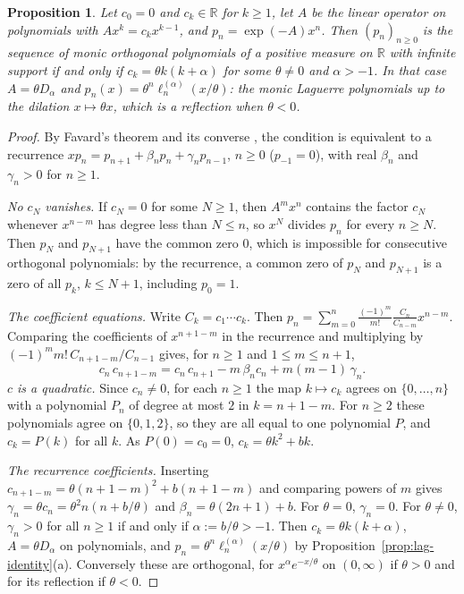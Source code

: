 \documentclass[11pt]{amsart}
\newtheorem{proposition}[theorem]{Proposition}
\theoremstyle{definition}
\theoremstyle{remark}
\numberwithin{equation}{section}
\newcommand{\R}{\mathbb{R}}
\begin{document}
\begin{proposition}\label{prop:lag-unique}
Let $c_0=0$ and $c_k\in\R$ for $k\ge1$, let $A$ be the linear operator on polynomials with $Ax^k=c_kx^{k-1}$, and $p_n=\exp(-A)x^n$. Then $(p_n)_{n\ge0}$ is the sequence of monic orthogonal polynomials of a positive measure on $\R$ with infinite support if and only if $c_k=\theta k(k+\alpha)$ for some $\theta\ne0$ and $\alpha>-1$. In that case $A=\theta D_\alpha$ and $p_n(x)=\theta^n\ell^{(\alpha)}_n(x/\theta)$: the monic Laguerre polynomials up to the dilation $x\mapsto\theta x$, which is a reflection when $\theta<0$.
\end{proposition}

\begin{proof}
By Favard's theorem \cite[Chapter~I, Section~4]{Chi} and its converse \cite[Theorem~3.2.1]{Sz}, the condition is equivalent to a recurrence $xp_n=p_{n+1}+\beta_np_n+\gamma_np_{n-1}$, $n\ge0$ ($p_{-1}=0$), with real $\beta_n$ and $\gamma_n>0$ for $n\ge1$.

\emph{No $c_N$ vanishes.} If $c_N=0$ for some $N\ge1$, then $A^mx^n$ contains the factor $c_N$ whenever $x^{n-m}$ has degree less than $N\le n$, so $x^N$ divides $p_n$ for every $n\ge N$. Then $p_N$ and $p_{N+1}$ have the common zero $0$, which is impossible for consecutive orthogonal polynomials: by the recurrence, a common zero of $p_N$ and $p_{N+1}$ is a zero of all $p_k$, $k\le N+1$, including $p_0=1$.

\emph{The coefficient equations.} Write $C_k=c_1\cdots c_k$. Then $p_n=\sum_{m=0}^{n}\frac{(-1)^m}{m!}\frac{C_n}{C_{n-m}}x^{n-m}$. Comparing the coefficients of $x^{n+1-m}$ in the recurrence and multiplying by $(-1)^mm!\,C_{n+1-m}/C_{n-1}$ gives, for $n\ge1$ and $1\le m\le n+1$,
\[
c_n\,c_{n+1-m}=c_n\,c_{n+1}-m\,\beta_nc_n+m(m-1)\,\gamma_n .
\]
\emph{$c$ is a quadratic.} Since $c_n\ne0$, for each $n\ge1$ the map $k\mapsto c_k$ agrees on $\{0,\dots,n\}$ with a polynomial $P_n$ of degree at most $2$ in $k=n+1-m$. For $n\ge2$ these polynomials agree on $\{0,1,2\}$, so they are all equal to one polynomial $P$, and $c_k=P(k)$ for all $k$. As $P(0)=c_0=0$, $c_k=\theta k^2+bk$.

\emph{The recurrence coefficients.} Inserting $c_{n+1-m}=\theta(n+1-m)^2+b(n+1-m)$ and comparing powers of $m$ gives $\gamma_n=\theta c_n=\theta^2n(n+b/\theta)$ and $\beta_n=\theta(2n+1)+b$. For $\theta=0$, $\gamma_n=0$. For $\theta\ne0$, $\gamma_n>0$ for all $n\ge1$ if and only if $\alpha:=b/\theta>-1$. Then $c_k=\theta k(k+\alpha)$, $A=\theta D_\alpha$ on polynomials, and $p_n=\theta^n\ell^{(\alpha)}_n(x/\theta)$ by Proposition~\ref{prop:lag-identity}(a). Conversely these are orthogonal, for $x^\alpha e^{-x/\theta}$ on $(0,\infty)$ if $\theta>0$ and for its reflection if $\theta<0$.
\end{proof}
\end{document}

